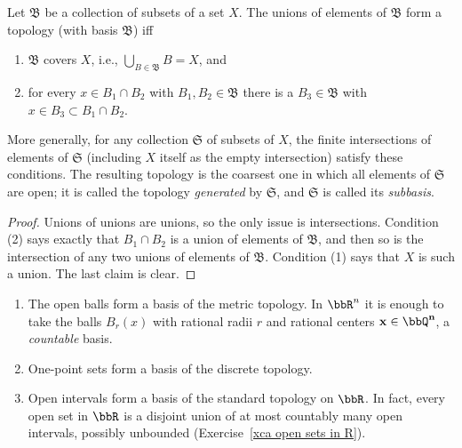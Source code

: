 \begin{prop}\label{prop generating topology}
    Let $\mathfrak{B}$ be a collection of subsets of a set $X$. The unions of elements of $\mathfrak{B}$ form a topology (with basis $\mathfrak{B}$) iff
    \begin{enumerate}
        \item $\mathfrak{B}$ covers $X$, i.e., $\bigcup_{B\in\mathfrak{B}}B=X$, and
        \item for every $x\in B_1\cap B_2$ with $B_1,B_2\in\mathfrak{B}$ there is a $B_3\in\mathfrak{B}$ with $x\in B_3\subset B_1\cap B_2$.
    \end{enumerate}
    More generally, for any collection $\mathfrak{S}$ of subsets of $X$, the finite intersections of elements of $\mathfrak{S}$ (including $X$ itself as the empty intersection) satisfy these conditions. The resulting topology is the coarsest one in which all elements of $\mathfrak{S}$ are open; it is called the topology \emph{generated} by $\mathfrak{S}$, and $\mathfrak{S}$ is called its \emph{subbasis}.
\end{prop}
\begin{proof}
    Unions of unions are unions, so the only issue is intersections. Condition (2) says exactly that $B_1\cap B_2$ is a union of elements of $\mathfrak{B}$, and then so is the intersection of any two unions of elements of $\mathfrak{B}$. Condition (1) says that $X$ is such a union. The last claim is clear.
\end{proof}

\begin{example}\label{examples of basis of topology}
    \begin{enumerate}
        \item The open balls form a basis of the metric topology. In $\bbR^n$ it is enough to take the balls $B_r(x)$ with rational radii $r$ and rational centers $\bf{x}\in\bbQ^n$, a \emph{countable} basis.
        \item One-point sets form a basis of the discrete topology.
        \item Open intervals form a basis of the standard topology on $\bbR$. In fact, every open set in $\bbR$ is a disjoint union of at most countably many open intervals, possibly unbounded (Exercise~\ref{xca open sets in R}).
    \end{enumerate}
\end{example}

